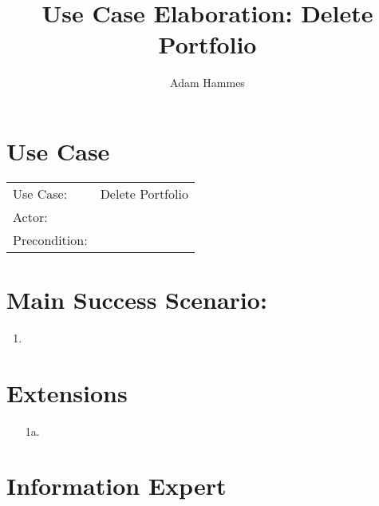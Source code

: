 \documentclass{article}
\title{Use Case Elaboration: Delete Portfolio}
\author{ Adam Hammes }
\begin{document}
\maketitle


\section*{Use Case}
\begin{tabular}{l l}
Use Case:     & Delete Portfolio\\
Actor:        & \\
Precondition: & \\
\end{tabular}


\section*{Main Success Scenario:}

\begin{enumerate}
    \item 

\end{enumerate}

\section*{Extensions}

\begin{itemize}
    \item [1a.]
                            
\end{itemize}


\section*{Information Expert}
\end{document}

